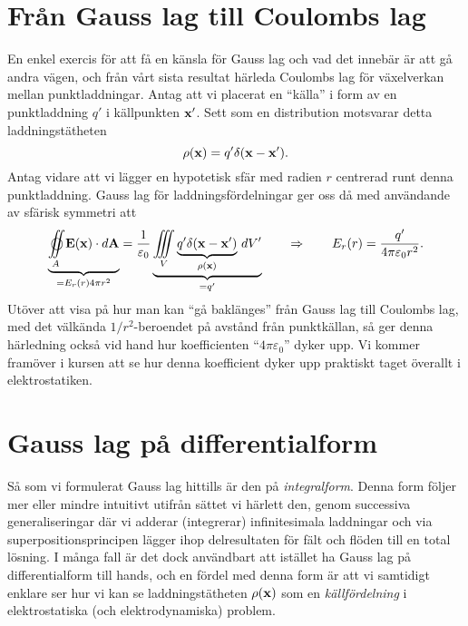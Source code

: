 \section{Fr{\aa}n Gauss lag till Coulombs lag}
En enkel exercis f{\"o}r att f{\aa} en k{\"a}nsla f{\"o}r Gauss lag och vad det inneb{\"a}r {\"a}r att g{\aa} andra v{\"a}gen, och fr{\aa}n v{\aa}rt sista resultat h{\"a}rleda Coulombs lag f{\"o}r v{\"a}xelverkan mellan punktladdningar.
Antag att vi placerat en ``k{\"a}lla'' i form av en punktladdning $q'$ i k{\"a}llpunkten ${\bf x}'$. Sett som en distribution motsvarar detta laddningst{\"a}theten
$$
  \rho({\bf x})=q'\delta({\bf x}-{\bf x}').
$$
Antag vidare att vi l{\"a}gger en hypotetisk sf{\"a}r med radien $r$ centrerad runt denna punktladdning. Gauss lag f{\"o}r laddningsf{\"o}rdelningar ger oss d{\aa} med anv{\"a}ndande av sf{\"a}risk symmetri att
$$
  \underbrace{
    \oiint_A {\bf E}({\bf x})\cdot d{\bf A}
  }_{=E_r(r)4\pi r^2}
  ={{1}\over{\varepsilon_0}}
  \underbrace{
       \iiint_V\underbrace{
           q'\delta({\bf x}-{\bf x}')
       }_{\rho({\bf x})}\,dV'
  }_{=q'}
  \qquad\Rightarrow\qquad
  E_r(r) = {{q'}\over{4\pi\varepsilon_0 r^2}}.
$$
Ut{\"o}ver att visa p{\aa} hur man kan ``g{\aa} bakl{\"a}nges'' fr{\aa}n Gauss lag till Coulombs lag, med det v{\"a}lk{\"a}nda $1/r^2$-beroendet p{\aa} avst{\aa}nd fr{\aa}n punktk{\"a}llan, s{\aa} ger denna h{\"a}rledning ocks{\aa} vid hand hur koefficienten ``$4\pi\varepsilon_0$'' dyker upp. Vi kommer fram{\"o}ver i kursen att se hur denna koefficient dyker upp praktiskt taget {\"o}verallt i elektrostatiken.

\section{Gauss lag p{\aa} differentialform}
S{\aa} som vi formulerat Gauss lag hittills {\"a}r den p{\aa} {\it integralform}. Denna form f{\"o}ljer mer eller mindre intuitivt utifr{\aa}n s{\"a}ttet vi h{\"a}rlett den, genom successiva generaliseringar d{\"a}r vi adderar (integrerar) infinitesimala laddningar och via superpositionsprincipen l{\"a}gger ihop delresultaten f{\"o}r f{\"a}lt och fl{\"o}den till en total l{\"o}sning.
I m{\aa}nga fall {\"a}r det dock anv{\"a}ndbart att ist{\"a}llet ha Gauss lag p{\aa} differentialform till hands, och en f{\"o}rdel med denna form {\"a}r att vi samtidigt enklare ser hur vi kan se laddningst{\"a}theten $\rho({\bf x})$ som en {\it k{\"a}llf{\"o}rdelning} i elektrostatiska (och elektrodynamiska) problem.

